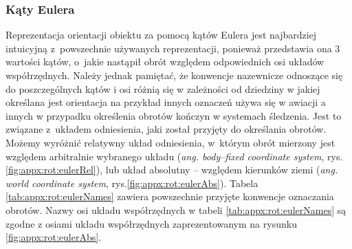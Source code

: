 \subsubsection*{Kąty Eulera} \label{sec:orientstionRep:euler}
Reprezentacja orientacji obiektu za pomocą kątów Eulera jest najbardziej intuicyjną z~powszechnie używanych reprezentacji, ponieważ przedstawia ona 3 wartości kątów, o~jakie nastąpił obrót względem odpowiednich osi układów współrzędnych. Należy jednak pamiętać, że konwencje nazewnicze odnoszące się do poszczególnych kątów i osi różnią się w zależności od dziedziny w jakiej określana jest orientacja na przykład innych oznaczeń używa się w awiacji a innych w przypadku określenia obrotów kończyn w systemach śledzenia. Jest to związane z~układem odniesienia, jaki został przyjęty do określania obrotów. Możemy wyróżnić relatywny układ odniesienia, w~którym obrót mierzony jest względem arbitralnie wybranego układu (\emph{ang. body--fixed coordinate system}, rys.\ref{fig:appx:rot:eulerRel}), lub układ absolutny -- względem kierunków ziemi (\emph{ang. world coordinate system}, rys.\ref{fig:appx:rot:eulerAbs}). Tabela \ref{tab:appx:rot:eulerNames} zawiera powszechnie przyjęte konwencje oznaczania obrotów. Nazwy osi układu współrzędnych w tabeli  \ref{tab:appx:rot:eulerNames} są zgodne z osiami układu współrzędnych zaprezentowanym na rysunku \ref{fig:appx:rot:eulerAbs}.
																													
